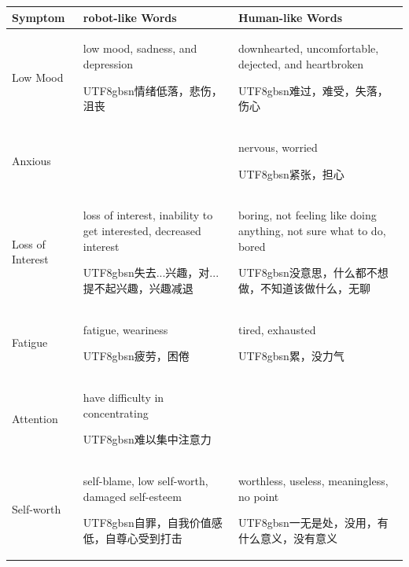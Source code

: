\begin{table}[th]
    \small
    \centering
    \begin{tabular}{|m{2.8cm}|m{4cm} | m{4cm}| }
    \hline
    Symptom & robot-like Words & Human-like Words \\
    \hline
    Low Mood & \makecell[c{p{4cm}}]{low mood, sadness, and depression \\\begin{CJK*}{UTF8}{gbsn}情绪低落，悲伤，沮丧\end{CJK*}} &  \makecell[c{p{4cm}}]{downhearted, uncomfortable, dejected, and heartbroken\\\begin{CJK*}{UTF8}{gbsn}难过，难受，失落，伤心\end{CJK*}}\\
    \hline
    Anxious &  & \makecell[c{p{4cm}}]{nervous, worried\\ \begin{CJK*}{UTF8}{gbsn}紧张，担心\end{CJK*}} \\
    \hline
    Loss of Interest & \makecell[c{p{4cm}}]{loss of interest, inability to get interested, decreased interest\\ \begin{CJK*}{UTF8}{gbsn}失去...兴趣，对...提不起兴趣，兴趣减退\end{CJK*}} & \makecell[c{p{4cm}}]{boring, not feeling like doing anything, not sure what to do, bored\\ \begin{CJK*}{UTF8}{gbsn}没意思，什么都不想做，不知道该做什么，无聊\end{CJK*}} \\
    \hline
    Fatigue & \makecell[c{p{4cm}}]{fatigue, weariness\\ \begin{CJK*}{UTF8}{gbsn}疲劳，困倦\end{CJK*}} & \makecell[c{p{4cm}}]{tired, exhausted\\ \begin{CJK*}{UTF8}{gbsn}累，没力气\end{CJK*}} \\
    \hline
    Attention & \makecell[c{p{4cm}}]{have difficulty in concentrating\\ \begin{CJK*}{UTF8}{gbsn}难以集中注意力\end{CJK*}} & \\
    \hline
    Self-worth & \makecell[c{p{4cm}}]{self-blame, low self-worth, damaged self-esteem\\ \begin{CJK*}{UTF8}{gbsn}自罪，自我价值感低，自尊心受到打击\end{CJK*}} & \makecell[c{p{4cm}}]{worthless, useless, meaningless, no point\\ \begin{CJK*}{UTF8}{gbsn}一无是处，没用，有什么意义，没有意义\end{CJK*}}\\

\end{tabular}
\end{table}
